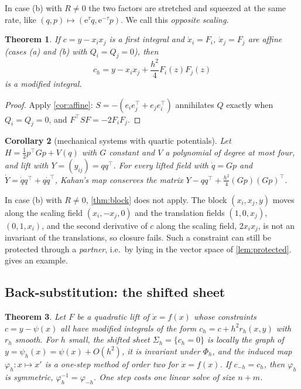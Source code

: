 \documentclass[11pt,a4paper]{article}
\newtheorem{theorem}{Theorem}[section]
\newtheorem{corollary}[theorem]{Corollary}
\theoremstyle{definition}
\theoremstyle{remark}
\newcommand{\tr}{^{\!\top}}
\begin{document}
In case (b) with $R\ne0$ the two factors are stretched and squeezed at the same rate, like
$(q,p)\mapsto(\mathrm e^\tau q,\mathrm e^{-\tau}p)$. We call this \emph{opposite scaling}.

\begin{theorem}\label{thm:affine-constraints}
If $c=y-x_ix_j$ is a first integral and $\dot x_i=F_i$, $\dot x_j=F_j$ are affine (cases (a) and (b) with
$Q_i=Q_j=0$), then
\[
c_h=y-x_ix_j+\frac{h^2}{4}F_i(z)F_j(z)
\]
is a modified integral.
\end{theorem}

\begin{proof}
Apply \cref{cor:affine}: $S=-(e_ie_j\tr+e_je_i\tr)$ annihilates $Q$ exactly when $Q_i=Q_j=0$, and
$F\tr SF=-2F_iF_j$.
\end{proof}

\begin{corollary}[mechanical systems with quartic potentials]\label{cor:mech}
Let $H=\frac12p\tr Gp+V(q)$ with $G$ constant and $V$ a polynomial of degree at most four, and lift with
$Y=(y_{ij})=qq\tr$. For every lifted field with $\dot q=Gp$ and $\dot Y=\dot qq\tr+q\dot q\tr$, Kahan's map
conserves the matrix $Y-qq\tr+\frac{h^2}{4}(Gp)(Gp)\tr$.
\end{corollary}

In case (b) with $R\ne0$, \cref{thm:block} does not apply. The block $(x_i,x_j,y)$ moves along the scaling
field $(x_i,-x_j,0)$ and the translation fields $(1,0,x_j)$, $(0,1,x_i)$, and the second derivative of $c$
along the scaling field, $2x_ix_j$, is not an invariant of the translations, so closure fails. Such a
constraint can still be protected through a \emph{partner}, i.e.\ by lying in the vector space of
\cref{lem:protected}.  gives an example.

\subsection{Back-substitution: the shifted sheet}

\begin{theorem}\label{thm:sheet}
Let $F$ be a quadratic lift of $\dot x=f(x)$ whose constraints $c=y-\psi(x)$ all have modified integrals of
the form $c_h=c+h^2r_h(x,y)$ with $r_h$ smooth. For $h$ small, the \emph{shifted sheet}
$\Sigma_h=\{c_h=0\}$ is locally the graph of $y=\psi_h(x)=\psi(x)+O(h^2)$, it is invariant under $\Phi_h$,
and the induced map $\varphi_h\colon x\mapsto x'$ is a one-step method of order two for $\dot x=f(x)$. If
$c_{-h}=c_h$, then $\varphi_h$ is symmetric, $\varphi_h^{-1}=\varphi_{-h}$. One step costs one linear solve
of size $n+m$.
\end{theorem}
\end{document}
